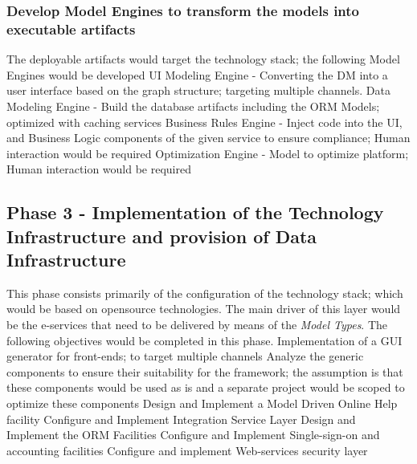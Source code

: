 \subsubsection{Develop Model Engines to transform the models into executable artifacts}
The deployable artifacts would target the technology stack; the following Model Engines would be developed
\slist
\spit UI Modeling Engine - Converting the \gls{DM} into a user interface based on the graph structure; targeting multiple channels.
\spit Data Modeling Engine - Build the database artifacts including the ORM Models; optimized with caching services
\spit Business Rules Engine - Inject code into the UI, and Business Logic components of the given service to ensure compliance; Human interaction would be required
\spit Optimization Engine - Model to optimize platform; Human interaction would be required
\elist
\subsection{Phase 3 - Implementation of the Technology Infrastructure and provision of Data Infrastructure}
This phase consists primarily of the configuration of the technology stack; which would be based on opensource technologies. The main driver of this layer would be the e-services that need to be delivered by means of the \textit{Model Types}. The following objectives would be completed in this phase. 
\slist
\spit Implementation of a GUI generator for front-ends; to target multiple channels
\spit Analyze the generic components to ensure their suitability for the framework; the assumption is that these components would be used as is and a separate project would be scoped to optimize these components
\spit Design and Implement a Model Driven Online Help facility
\spit Configure and Implement Integration Service Layer
\spit Design and Implement the ORM Facilities 
\spit Configure and Implement Single-sign-on and accounting facilities
\spit Configure and implement Web-services security layer
\elist
